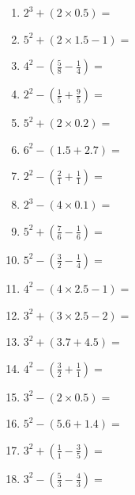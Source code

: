 \documentclass[12pt]{article}
\begin{document}
    \begin{enumerate}
\item \large $ 2^{3} + (2 \times 0.5) = $ \vspace{1.4cm}
\item \large $ 5^{2} + (2 \times 1.5 - 1) = $ \vspace{1.4cm}
\item \large $ 4^{2} - (\frac{5}{8} - \frac{1}{4}) = $ \vspace{1.4cm}
\item \large $ 2^{2} - (\frac{1}{5} + \frac{9}{5}) = $ \vspace{1.4cm}
\item \large $ 5^{2} + (2 \times 0.2) = $ \vspace{1.4cm}
\item \large $ 6^{2} - (1.5 + 2.7) = $ \vspace{1.4cm}
\item \large $ 2^{2} - (\frac{2}{1} + \frac{1}{1}) = $ \vspace{1.4cm}
\item \large $ 2^{3} - (4 \times 0.1) = $ \vspace{1.4cm}
\newpage
\item \large $ 5^{2} + (\frac{7}{6} - \frac{1}{6}) = $ \vspace{1.4cm}
\item \large $ 5^{2} - (\frac{3}{2} - \frac{1}{4}) = $ \vspace{1.4cm}
\item \large $ 4^{2} - (4 \times 2.5 - 1) = $ \vspace{1.4cm}
\item \large $ 3^{2} + (3 \times 2.5 - 2) = $ \vspace{1.4cm}
\item \large $ 3^{2} + (3.7 + 4.5) = $ \vspace{1.4cm}
\item \large $ 4^{2} - (\frac{3}{2} + \frac{1}{1}) = $ \vspace{1.4cm}
\item \large $ 3^{2} - (2 \times 0.5) = $ \vspace{1.4cm}
\item \large $ 5^{2} - (5.6 + 1.4) = $ \vspace{1.4cm}
\item \large $ 3^{2} + (\frac{1}{1} - \frac{3}{5}) = $ \vspace{1.4cm}
\item \large $ 3^{2} - (\frac{5}{3} - \frac{4}{3}) = $ \vspace{1.4cm}

\end{enumerate}
\end{document}
